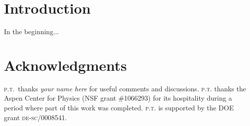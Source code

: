 \documentclass[12pt]{article}
\begin{document}
\small
\setcounter{tocdepth}{2}
\tableofcontents
\normalsize



\section{Introduction}

In the beginning... \lipsum[5]





 



 \section*{Acknowledgments}


\textsc{p.t.}\ thanks 
\emph{your name here}
for useful comments and discussions. 
%
\textsc{p.t.} thanks the Aspen Center for Physics (NSF grant \#1066293) for its hospitality during a period where part of this work was completed. \textsc{p.t.} is supported by the DOE grant \textsc{de-sc}/0008541.



% 
\end{document}

